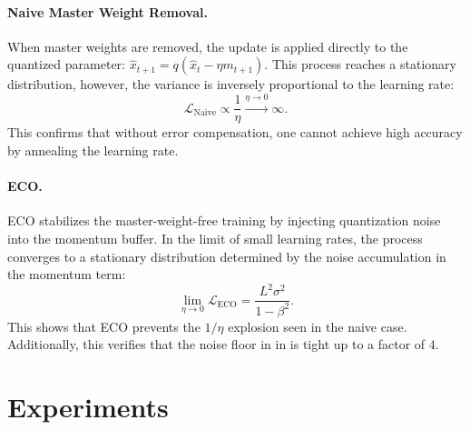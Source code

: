 \documentclass[11pt, a4paper, onecolumn, copyright, goog]{google}
\newcommand{\methodname}{ECO}
\theoremstyle{plain}
\theoremstyle{definition}
\theoremstyle{remark}
\begin{document}
\paragraph{Naive Master Weight Removal.}
When master weights are removed, the update is applied directly to the quantized parameter: $\hat{x}_{t+1} = q(\hat{x}_t - \eta m_{t+1})$. This process reaches a stationary distribution, however, the variance is inversely proportional to the learning rate:
\begin{equation}
    \mathcal{L}_{\text{Naive}} \propto \frac{1}{\eta} \xrightarrow{\eta \to 0} \infty.
\end{equation}
This confirms that without error compensation, one cannot achieve high accuracy by annealing the learning rate.

\paragraph{ECO.}
ECO stabilizes the master-weight-free training by injecting quantization noise into the momentum buffer. In the limit of small learning rates, the process converges to a stationary distribution determined by the noise accumulation in the momentum term:
\begin{equation}
    \lim_{\eta \to 0} \mathcal{L}_{\text{ECO}} = \frac{L^2 \sigma^2}{1-\beta^2}.
\end{equation}
This shows that \methodname{} prevents the $1/\eta$ explosion seen in the naive case. Additionally, this verifies that the noise floor in in  is tight up to a factor of $4$.

\section{Experiments}
\label{sec:exps}
\end{document}

